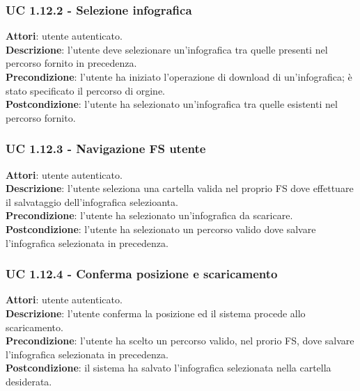 	\subsubsection{UC 1.12.2 - Selezione infografica}{
		\label{uc1.12.2}
		\textbf{Attori}: utente autenticato. \\
		\textbf{Descrizione}: l'utente deve selezionare un'infografica tra quelle presenti nel percorso fornito in precedenza. \\
		\textbf{Precondizione}: l'utente ha iniziato l'operazione di download di un'infografica; è stato specificato il percorso di orgine.	\\
		\textbf{Postcondizione}: l'utente ha selezionato un'infografica tra quelle esistenti nel percorso fornito.	\\
		}
	\subsubsection{UC 1.12.3 - Navigazione FS utente}{
		\label{uc1.12.3}
		\textbf{Attori}: utente autenticato. \\
		\textbf{Descrizione}: l'utente seleziona una cartella valida nel proprio FS dove effettuare il salvataggio dell'infografica selezioanta. \\
		\textbf{Precondizione}: l'utente ha selezionato un'infografica da scaricare.	\\
		\textbf{Postcondizione}: l'utente ha selezionato un percorso valido dove salvare l'infografica selezionata in precedenza.	\\
		}
	\subsubsection{UC 1.12.4 - Conferma posizione e scaricamento}{
		\label{uc1.12.4}
		\textbf{Attori}: utente autenticato. \\
		\textbf{Descrizione}: l'utente conferma la posizione ed il sistema procede allo scaricamento. \\
		\textbf{Precondizione}: l'utente ha scelto un percorso valido, nel prorio FS, dove salvare l'infografica selezionata in precedenza.	\\
		\textbf{Postcondizione}: il sistema ha salvato l'infografica selezionata nella cartella desiderata.	\\
		}